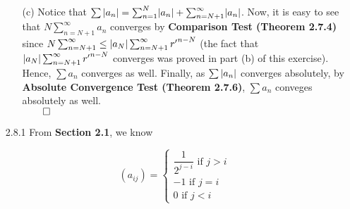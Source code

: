 \documentclass[11pt]{article}
\DeclarePairedDelimiter\abs{\lvert}{\rvert}%
\begin{document}
\begin{itemize}
\begin{itemize}
            \item[(c)]
                Notice that $\sum{\abs{a_n}} = \sum_{n = 1}^N \abs{a_n}  +
                \sum_{n = N + 1}^\infty\abs{a_n}$. Now, it is easy to see that
                $N\sum_{n = N + 1}^\infty a_n$ converges by \textbf{Comparison
                Test (Theorem 2.7.4)} since $N\sum_{n = N + 1}^\infty \leq
                \abs{a_N}\sum_{n = N + 1}^\infty {r^\prime}^{n - N}$ (the fact
                that $\abs{a_N}\sum_{n = N + 1}^\infty {r^\prime}^{n - N}$
                converges was proved in part (b) of this exercise). Hence,
                $\sum{a_n}$ converges as well. Finally, as $\sum{\abs{a_n}}$
                converges absolutely, by \textbf{Absolute Convergence Test
                (Theorem 2.7.6)}, $\sum{a_n}$ conveges absolutely as well.\\
                $\qed$
        \end{itemize}

    \item[2.8.1]
        From \textbf{Section 2.1}, we know

        \begin{equation*}
            (a_{ij}) =
            \begin{cases}
                \dfrac{1}{2^{j - i}} \text{ if } j > i\\
                -1 \text{ if } j = i\\
                0 \text{ if } j < i
            \end{cases}
        \end{equation*}


\end{itemize}
\end{document}
